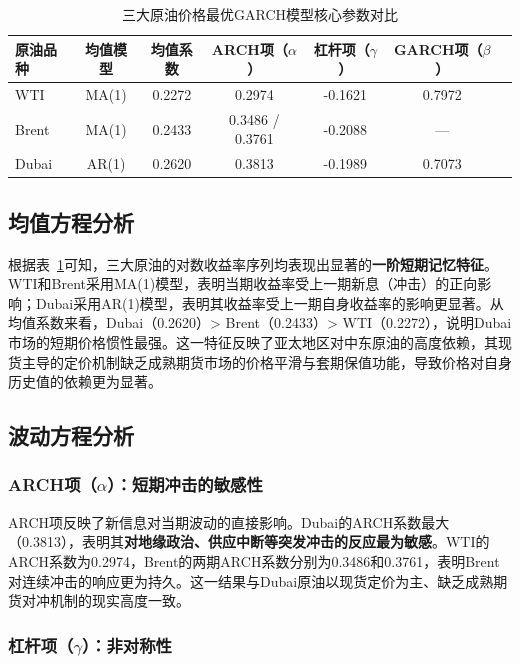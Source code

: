 \documentclass[12pt,a4paper]{ctexart}
\begin{document}
\begin{table}[H]
\centering
\caption{三大原油价格最优GARCH模型核心参数对比}
\label{tab:final_params}
\begin{tabular}{lcccccc}
\toprule
原油品种 & 均值模型 & 均值系数 & ARCH项（\(\alpha\)） & 杠杆项（\(\gamma\)） & GARCH项（\(\beta\)） \\
\midrule
WTI   & MA(1) & 0.2272 & 0.2974   & -0.1621 & 0.7972 \\
Brent & MA(1) & 0.2433 & 0.3486 / 0.3761 & -0.2088 & --- \\
Dubai & AR(1) & 0.2620 & 0.3813   & -0.1989 & 0.7073 \\
\bottomrule
\end{tabular}
\end{table}

\subsection{均值方程分析}

根据表~\ref{tab:final_params}可知，三大原油的对数收益率序列均表现出显著的\textbf{一阶短期记忆特征}。WTI和Brent采用MA(1)模型，表明当期收益率受上一期新息（冲击）的正向影响；Dubai采用AR(1)模型，表明其收益率受上一期自身收益率的影响更显著。从均值系数来看，Dubai（0.2620）> Brent（0.2433）> WTI（0.2272），说明Dubai市场的短期价格惯性最强。这一特征反映了亚太地区对中东原油的高度依赖，其现货主导的定价机制缺乏成熟期货市场的价格平滑与套期保值功能，导致价格对自身历史值的依赖更为显著。

\subsection{波动方程分析}

\subsubsection{ARCH项（\(\alpha\)）：短期冲击的敏感性}

ARCH项反映了新信息对当期波动的直接影响。Dubai的ARCH系数最大（0.3813），表明其\textbf{对地缘政治、供应中断等突发冲击的反应最为敏感}。WTI的ARCH系数为0.2974，Brent的两期ARCH系数分别为0.3486和0.3761，表明Brent对连续冲击的响应更为持久。这一结果与Dubai原油以现货定价为主、缺乏成熟期货对冲机制的现实高度一致。

\subsubsection{杠杆项（\(\gamma\)）：非对称性}
\end{document}
